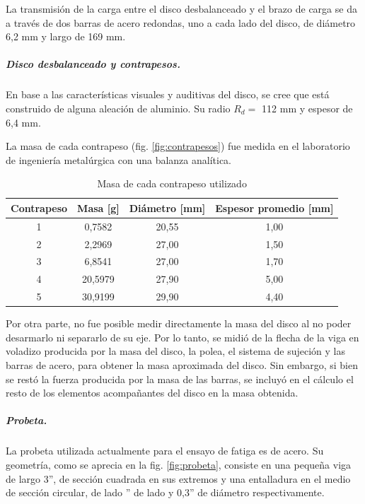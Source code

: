 La transmisión de la carga entre el disco desbalanceado y el brazo de carga se da a través de dos barras de acero redondas, uno a cada lado del disco, de diámetro 6,2 mm y largo de 169 mm.

\subparagraph{Disco desbalanceado y contrapesos.}
En base a las características visuales y auditivas del disco, se cree que está construido de alguna aleación de aluminio. Su radio $R_d =$ 112 mm y espesor de 6,4 mm. 

La masa de cada contrapeso (fig. \ref{fig:contrapesos}) fue medida en el laboratorio de ingeniería metalúrgica con una balanza analítica.
\begin{table}[H]
\centering
\begin{tabular}{@{}cccc@{}}
\toprule
Contrapeso & Masa {[}g{]}	& Diámetro {[}mm{]}	&	Espesor promedio {[}mm{]} \\ \midrule
1          & 0,7582			& 20,55				&	1,00	         		  \\
2          & 2,2969       	& 27,00				&	1,50					  \\
3          & 6,8541       	& 27,00				& 	1,70	 		   		  \\
4          & 20,5979      	& 27,90				& 	5,00			 		  \\
5          & 30,9199      	& 29,90				&	4,40			 		  \\ \bottomrule
\end{tabular}
\caption{Masa de cada contrapeso utilizado}
\label{tab:masa_contrapesos}
\end{table}

Por otra parte, no fue posible medir directamente la masa del disco al no poder desarmarlo ni separarlo de su eje. Por lo tanto, se midió de la flecha de la viga en voladizo producida por la masa del disco, la polea, el sistema de sujeción y las barras de acero, para obtener la masa aproximada del disco. Sin embargo, si bien se restó la fuerza producida por la masa de las barras, se incluyó en el cálculo el resto de los elementos acompañantes del disco en la masa obtenida.

\subparagraph{Probeta.} La probeta utilizada actualmente para el ensayo de fatiga es de acero. Su geometría, como se aprecia en la fig. \ref{fig:probeta}, consiste en una pequeña viga de largo 3'', de sección cuadrada en sus extremos y una entalladura en el medio de sección circular, de lado '' de lado y 0,3'' de diámetro respectivamente.
 
